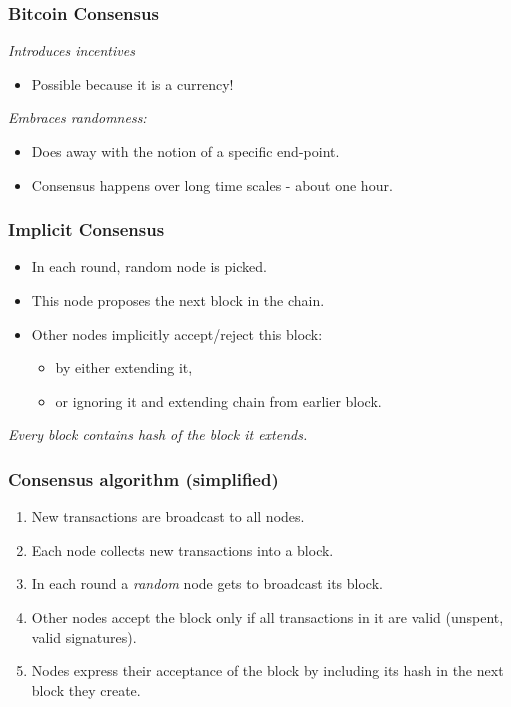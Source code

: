 \documentclass{beamer}
\begin{document}
\begin{frame}[fragile]
  \frametitle{Bitcoin Consensus}
 \emph{ Introduces incentives}
	\begin{itemize}
		\item Possible because it is a currency!
	\end{itemize}

	\pause
	\emph{Embraces randomness:}

	\begin{itemize}
		\item Does away with the notion of a specific end-point.
		\item Consensus happens over long time scales - about one hour.
	\end{itemize}
\end{frame}
\begin{frame}
  \frametitle{Implicit Consensus}

	\begin{itemize}
		\item In each round, random node is picked. \pause
		\item This node proposes the next block in the chain. \pause
		\item Other nodes implicitly accept/reject this block:
		\begin{itemize}
			\item by either extending it,
			\item or ignoring it and extending chain from earlier block.
		\end{itemize}
	\end{itemize}
	\pause
\emph{Every block contains hash of the block it extends.}

\end{frame}
\begin{frame}
  \frametitle{Consensus algorithm (simplified)}
	\begin{enumerate}
		\item New transactions are broadcast to all nodes. \pause
		\item Each node collects new transactions into a block. \pause
		\item In each round a \emph{random} node gets to broadcast its block. \pause
		\item Other nodes accept the block only if all transactions in it are valid (unspent, valid signatures). \pause
		\item Nodes express their acceptance of the block by including its hash in the next block they create.
	\end{enumerate}
\end{frame}
\end{document}
